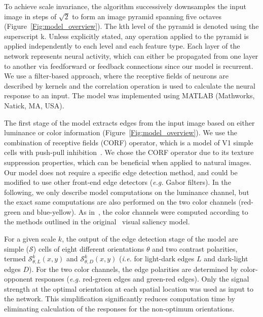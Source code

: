 \documentclass[12pt]{article}
\newcommand{\ie}[0]{{\em i.e.}\xspace}
\newcommand{\eg}[0]{{\em e.g.}\xspace}
\begin{document}
To achieve scale invariance, the algorithm
successively
downsamples the input image
 in steps of $\sqrt2$
to form an image pyramid spanning five octaves (Figure~\ref{Fig:model_overview}). The kth level
of the pyramid is denoted using the superscript k. Unless explicitly
stated, any operation applied to the pyramid is applied independently to each level and each feature type. Each layer of the network represents neural
activity, which can either be propagated from one layer to another via
feedforward or feedback connections since our model is recurrent. We use a filter-based approach, where the receptive fields of neurons are
described by kernels and the correlation operation is used to calculate the neural response to an input. The
model was implemented using MATLAB (Mathworks, Natick, MA,
USA).

%
%
The first stage of the model
extracts edges from the input image
%
based on either luminance or color information (Figure~\ref{Fig:model_overview}).
 We use the combination of receptive fields (CORF) operator, which is a
model of V1 simple cells with push-pull
inhibition~\citep{Azzopardi_etal14}. We chose the CORF operator due to its texture suppression properties, which can be beneficial
when applied to natural images. Our model does not require a specific edge detection method, and could be modified to use other front-end edge detectors (\eg Gabor filters).
%
In the following, we only describe model computations on the luminance channel, but the exact same computations are also performed on the two color channels (red-green and blue-yellow). As in~\citet{Russell_etal14}, the color channels were computed according to the methods outlined in the original~\citet{Itti_etal98a} visual saliency model.
%

For a given scale $k$, the output of the edge detection stage of the model are simple ($\mathcal{S}$) cells of eight different orientations $\theta$ and two contrast polarities, termed $\mathcal{S}^k_{\theta,L}(x,y)$ and $\mathcal{S}^k_{\theta,D}(x,y)$ (\ie for light-dark edges $L$ and dark-light edges $D$). For the two color channels, the edge polarities are determined by color-opponent responses (\eg red-green edges and green-red edges). Only the signal strength at the optimal orientation at each spatial location was used as input to the network. This simplification significantly reduces computation time by eliminating calculation of the responses for the non-optimum orientations.
\end{document}
